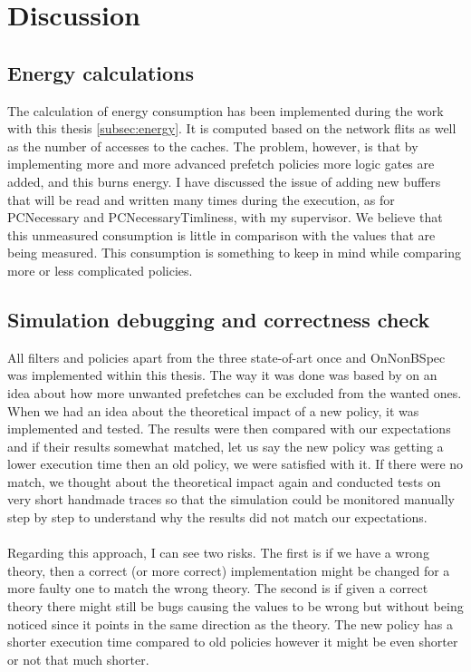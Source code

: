 \chapter{Discussion}
\label{chap:discussion}

\section{Energy calculations }
 The calculation of energy consumption has been implemented during the work with this thesis \ref{subsec:energy}. It is computed based on the network flits as well as the number of accesses to the caches. The problem, however, is that by implementing more and more advanced prefetch policies more logic gates are added, and this burns energy. I have discussed the issue of adding new buffers that will be read and written many times during the execution, as for PCNecessary and PCNecessaryTimliness, with my supervisor. We believe that this unmeasured consumption is little in comparison with the values that are being measured. This consumption is something to keep in mind while comparing more or less complicated policies. 

\section{Simulation debugging and correctness check }
 All filters and policies apart from the three state-of-art once and OnNonBSpec was implemented within this thesis. The way it was done was based by on an idea about how more unwanted prefetches can be excluded from the wanted ones. When we had an idea about the theoretical impact of a new policy, it was implemented and tested. The results were then compared with our expectations and if their results somewhat matched, let us say the new policy was getting a lower execution time then an old policy, we were satisfied with it. If there were no match, we thought about the theoretical impact again and conducted tests on very short handmade traces so that the simulation could be monitored manually step by step to understand why the results did not match our expectations.
 \\ \\
Regarding this approach, I can see two risks. The first is if we have a wrong theory, then a correct (or more correct) implementation might be changed for a more faulty one to match the wrong theory. The second is if given a correct theory there might still be bugs causing the values to be wrong but without being noticed since it points in the same direction as the theory. The new policy has a shorter execution time compared to old policies however it might be even shorter or not that much shorter.